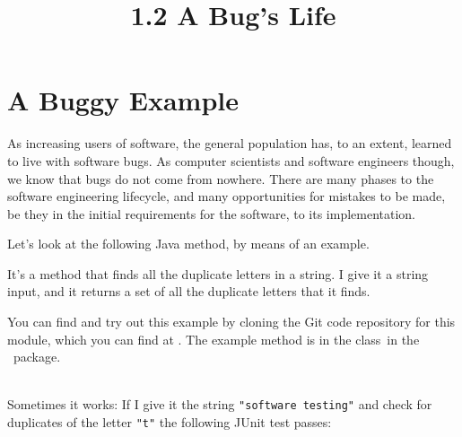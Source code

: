 



\title{1.2 A Bug's Life}

\section{A Buggy Example}


As increasing users of software, the general population has, to an extent,
learned to live with software bugs. As computer scientists and software
engineers though, we know that bugs do not come from nowhere. There are many
phases to the software engineering lifecycle, and many opportunities for
mistakes to be made, be they in the initial requirements for the software, to
its implementation.

Let's look at the following Java method, by means of an example.


It's a method that finds all the duplicate letters in a string. I give it a
string input, and it returns a set of all the duplicate letters that it finds.

You can find and try out this example by cloning the Git code repository for
this module, which you can find at \examplesrepourl. The example method is in
the class~\stringutilsbuggyoneclass in the \examplespackage~package. 

\begin{center} 
\end{center}    
~\\

Sometimes it works: If I give it the string {\tt "software testing"} and check
for duplicates of the letter {\tt "t"} the following JUnit test passes:

\begin{center} 
\end{center} 

